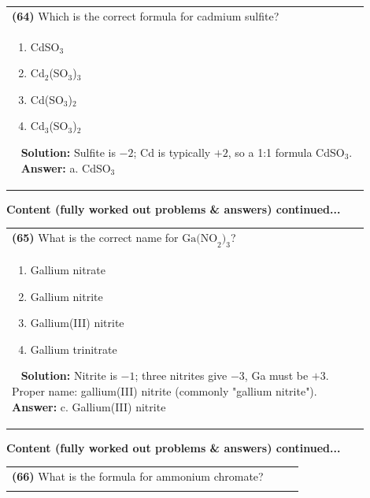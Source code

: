 \documentclass{article}
\begin{document}
{\begin{tabular}{|p{0.9\linewidth}|}
\textbf{(64)} Which is the correct formula for cadmium sulfite? \\
\begin{minipage}[t]{0.85\linewidth}
\begin{enumerate}[label=\alph*.]
\item CdSO$_3$ \
\item Cd$_2$(SO$_3$)$_3$ \
\item Cd(SO$_3$)$_2$ \
\item Cd$_3$(SO$_3$)$_2$
\end{enumerate}
\end{minipage}\
\hline
\vspace{0.2cm}
\textbf{Solution:} Sulfite is $-2$; Cd is typically $+2$, so a 1:1 formula CdSO$_3$. \
\hline
\vspace{0.2cm}
\textbf{Answer:} a. CdSO$_3$ \
\hline
\end{tabular}
\newpage
\noindent
{\large\textbf{Content (fully worked out problems & answers) continued...}}\\[0.2em]
\begin{tabular}{|p{0.9\linewidth}|}
\hline
\vspace{0.2cm}
\textbf{(65)} What is the correct name for $\text{Ga(NO}_2)_3$? \\
\begin{minipage}[t]{0.85\linewidth}
\begin{enumerate}[label=\alph*.]
\item Gallium nitrate \
\item Gallium nitrite \
\item Gallium(III) nitrite \
\item Gallium trinitrate
\end{enumerate}
\end{minipage}\
\hline
\vspace{0.2cm}
\textbf{Solution:} Nitrite is $-1$; three nitrites give $-3$, Ga must be $+3$. Proper name: gallium(III) nitrite (commonly "gallium nitrite"). \
\hline
\vspace{0.2cm}
\textbf{Answer:} c. Gallium(III) nitrite \
\hline
\end{tabular}
\newpage
\noindent
{\large\textbf{Content (fully worked out problems & answers) continued...}}\\[0.2em]
\begin{tabular}{|p{0.9\linewidth}|}
\hline
\vspace{0.2cm}
\textbf{(66)} What is the formula for ammonium chromate? \\
\begin{minipage}[t]{0.85\linewidth}

\end{minipage}
\end{tabular}}
\end{document}
